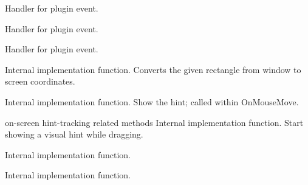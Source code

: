 \label{cbbardragpluginonldblclick}


Handler for plugin event.


\label{cbbardragpluginonmousemove}


Handler for plugin event.


\label{cbbardragpluginonstartbardragging}


Handler for plugin event.


\label{cbbardragpluginrecttoscr}


Internal implementation function.
Converts the given rectangle from window to screen coordinates.


\label{cbbardragpluginshowhint}


Internal implementation function.
Show the hint; called within OnMouseMove.


\label{cbbardragpluginstarttracking}


on-screen hint-tracking related methods
Internal implementation function.
Start showing a visual hint while dragging.


\label{cbbardragpluginsticktopane}


Internal implementation function.


\label{cbbardragpluginunstickfrompane}


Internal implementation function.

